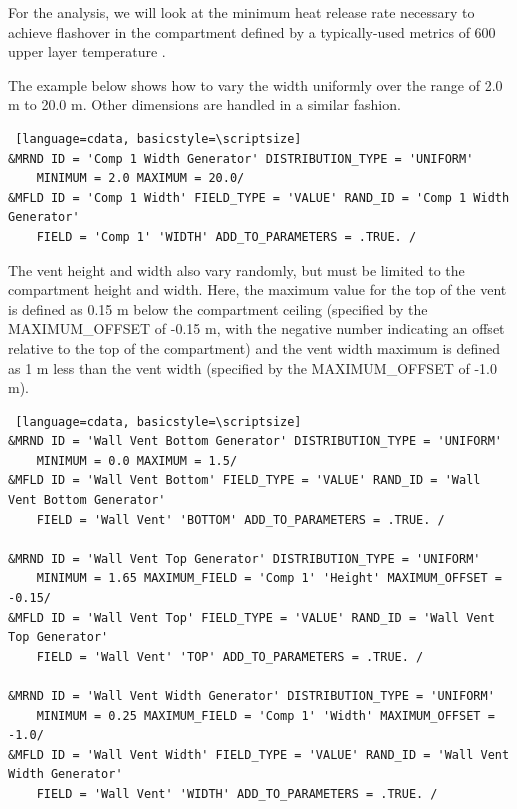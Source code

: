 \documentclass[12pt,twoside]{book}
\begin{document}
For the analysis, we will look at the minimum heat release rate necessary to achieve flashover in the compartment defined by a typically-used metrics of 600 \degc upper layer temperature \cite{Valid:Peacock_Flashover_1} \cite{Valid:Peacock_Flashover_2}.

The example below shows how to vary the width uniformly over the range of 2.0 m to 20.0 m. Other dimensions are handled in a similar fashion.

\vspace{\baselineskip}
\begin{lstlisting} [language=cdata, basicstyle=\scriptsize]
&MRND ID = 'Comp 1 Width Generator' DISTRIBUTION_TYPE = 'UNIFORM'
	MINIMUM = 2.0 MAXIMUM = 20.0/
&MFLD ID = 'Comp 1 Width' FIELD_TYPE = 'VALUE' RAND_ID = 'Comp 1 Width Generator'
	FIELD = 'Comp 1' 'WIDTH' ADD_TO_PARAMETERS = .TRUE. /
\end{lstlisting}

The vent height and width also vary randomly, but must be limited to the compartment height and width. Here, the maximum value for the top of the vent is defined as 0.15 m below the compartment ceiling (specified by the {\ct MAXIMUM\_OFFSET} of -0.15 m, with the negative number indicating an offset relative to the top of the compartment) and the vent width maximum is defined as 1 m less than the vent width (specified by the {\ct MAXIMUM\_OFFSET} of -1.0 m).

\vspace{\baselineskip}
\begin{lstlisting} [language=cdata, basicstyle=\scriptsize]
&MRND ID = 'Wall Vent Bottom Generator' DISTRIBUTION_TYPE = 'UNIFORM'
	MINIMUM = 0.0 MAXIMUM = 1.5/
&MFLD ID = 'Wall Vent Bottom' FIELD_TYPE = 'VALUE' RAND_ID = 'Wall Vent Bottom Generator'
	FIELD = 'Wall Vent' 'BOTTOM' ADD_TO_PARAMETERS = .TRUE. /

&MRND ID = 'Wall Vent Top Generator' DISTRIBUTION_TYPE = 'UNIFORM'
	MINIMUM = 1.65 MAXIMUM_FIELD = 'Comp 1' 'Height' MAXIMUM_OFFSET = -0.15/
&MFLD ID = 'Wall Vent Top' FIELD_TYPE = 'VALUE' RAND_ID = 'Wall Vent Top Generator'
	FIELD = 'Wall Vent' 'TOP' ADD_TO_PARAMETERS = .TRUE. /

&MRND ID = 'Wall Vent Width Generator' DISTRIBUTION_TYPE = 'UNIFORM'
    MINIMUM = 0.25 MAXIMUM_FIELD = 'Comp 1' 'Width' MAXIMUM_OFFSET = -1.0/
&MFLD ID = 'Wall Vent Width' FIELD_TYPE = 'VALUE' RAND_ID = 'Wall Vent Width Generator'
	FIELD = 'Wall Vent' 'WIDTH' ADD_TO_PARAMETERS = .TRUE. /
\end{lstlisting}
\end{document}
